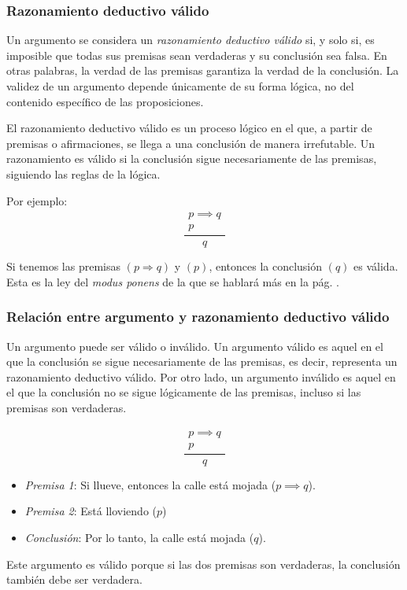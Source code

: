 \subsubsection{Razonamiento deductivo válido}
\vspace{1em}
\begin{fmd-definition}
	Un argumento se considera un \textit{razonamiento deductivo válido} si, y solo si, es imposible que todas sus premisas sean verdaderas y su conclusión sea falsa. En otras palabras, la verdad de las premisas garantiza la verdad de la conclusión. La validez de un argumento depende únicamente de su forma lógica, no del contenido específico de las proposiciones.
\end{fmd-definition}

El razonamiento deductivo válido es un proceso lógico en el que, a partir de premisas o afirmaciones, se llega a una conclusión de manera irrefutable. Un razonamiento es válido si la conclusión sigue necesariamente de las premisas, siguiendo las reglas de la lógica.

Por ejemplo:
\[ \frac{\begin{array}{l}
		p \implies  q\\
		p
\end{array}}{q} \]

Si tenemos las premisas $(p \Rightarrow q)$ y $(p)$, entonces la conclusión $(q)$ es válida. Esta es la ley del \textit{modus ponens} de la que se hablará más en la pág. \pageref{def:ponens}.

\subsubsection{Relación entre argumento y razonamiento deductivo válido}

Un argumento puede ser válido o inválido. Un argumento válido es aquel en el que la conclusión se sigue necesariamente de las premisas, es decir, representa un razonamiento deductivo válido. Por otro lado, un argumento inválido es aquel en el que la conclusión no se sigue lógicamente de las premisas, incluso si las premisas son verdaderas.


\begin{fmd-example}
	\[ \frac{\begin{array}{l}
			p \implies  q\\
			p
	\end{array}}{q} \]
	\begin{itemize}
		\item \textit{Premisa 1}: Si llueve, entonces la calle está mojada (\( p \implies q \)).
		\item \textit{Premisa 2}: Está lloviendo ($p$)
		\item \textit{Conclusión}: Por lo tanto, la calle está mojada ($q$).
	\end{itemize}
	Este argumento es válido porque si las dos premisas son verdaderas, la conclusión también debe ser verdadera.
\end{fmd-example}

